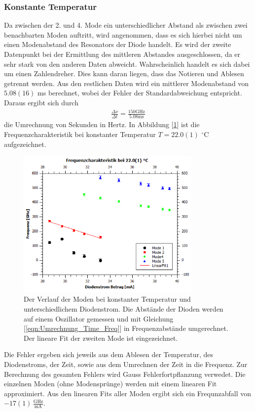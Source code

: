 \documentclass[a4paper,10pt]{scrartcl} %
\begin{document}
\subsubsection{Konstante Temperatur}
Da zwischen der 2. und 4. Mode ein unterschiedlicher Abstand als zwischen zwei benachbarten Moden auftritt, wird angenommen, dass es sich hierbei nicht um einen Modenabstand des Resonators der Diode handelt. Es wird der zweite Datenpunkt bei der Ermittlung des mittleren Abstandes ausgeschlossen, da er sehr stark von den anderen Daten abweicht. Wahrscheinlich handelt es sich dabei um einen Zahlendreher. Dies kann daran liegen, dass das Notieren und Ablesen getrennt werden. Aus den restlichen Daten wird ein mittlerer Modenabstand von $5.08(16)$ ms berechnet, wobei der Fehler der Standardabweichung entspricht. Daraus ergibt sich durch
\begin{align}
\label{eqn:Umrechnung_Time_Freq}
\frac{\Delta \nu}{\Delta t} = \frac{150 \text{GHz}}{5.08 \text{ms}}
\end{align}
die Umrechnung von Sekunden in Hertz. In Abbildung [\ref{fig:2_const_T}] ist die Frequenzcharakteristik bei konstanter Temperatur $T = 22.0(1) $ $^\circ{\text{C}}$ aufgezeichnet.
\begin{figure}
\centering
\includegraphics[width=0.8\textwidth]{Bilder/Frequenzchar_1.png}
\caption{Der Verlauf der Moden bei konstanter Temperatur und unterschiedlichem Diodenstrom. Die Abstände der Dioden werden auf einem Oszillator gemessen und mit Gleichung [\ref{eqn:Umrechnung_Time_Freq}] in Frequenzabstände umgerechnet. Der lineare Fit der zweiten Mode ist eingezeichnet.}
\label{fig:2_const_T}
\end{figure}
Die Fehler ergeben sich jeweils aus dem Ablesen der Temperatur, des Diodenstroms, der Zeit, sowie aus dem Umrechnen der Zeit in die Frequenz. Zur Berechnung des gesamten Fehlers wird Gauss Fehlerfortpflanzung verwedet. Die einzelnen Moden (ohne Modensprünge) werden mit einem linearen Fit approximiert. Aus den linearen Fits aller Moden ergibt sich ein Frequnzabfall von $-17(1) \,\frac{\text{GHz}}{\text{mA}}$.
\end{document}
